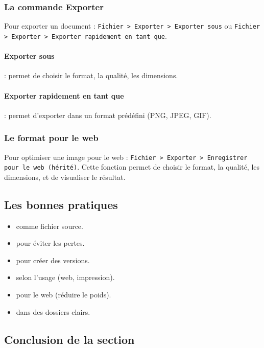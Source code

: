 \subsubsection{La commande Exporter}

Pour exporter un document : \texttt{Fichier > Exporter > Exporter sous} ou \texttt{Fichier > Exporter > Exporter rapidement en tant que}.

\paragraph{Exporter sous} : permet de choisir le format, la qualité, les dimensions.

\paragraph{Exporter rapidement en tant que} : permet d'exporter dans un format prédéfini (PNG, JPEG, GIF).

\subsubsection{Le format pour le web}

Pour optimiser une image pour le web : \texttt{Fichier > Exporter > Enregistrer pour le web (hérité)}. Cette fonction permet de choisir le format, la qualité, les dimensions, et de visualiser le résultat.

\subsection{Les bonnes pratiques}

\begin{itemize}
    \item {} comme fichier source.
    \item {} pour éviter les pertes.
    \item {} pour créer des versions.
    \item {} selon l'usage (web, impression).
    \item {} pour le web (réduire le poids).
    \item {} dans des dossiers clairs.
\end{itemize}

\subsection*{Conclusion de la section}

